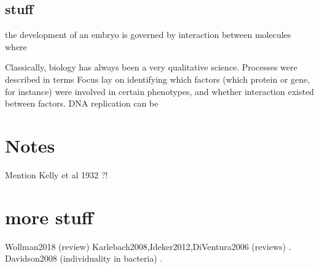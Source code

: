 \subsection*{stuff}

 the development of an embryo is governed by interaction between molecules where 


Classically, biology has always been a very qualitative science.
%
Processes were described in terms 
Focus lay on identifying which factors (which protein or gene, for instance) were involved in certain phenotypes, and whether interaction existed between factors.
%
DNA replication can be 




%
%
%




\section*{Notes}

Mention Kelly et al 1932 \cite{Kelly1932}?!

\section*{more stuff}


Wollman2018 (review)
Karlebach2008,Ideker2012,DiVentura2006 (reviews) \cite{Karlebach2008,Ideker2012,DiVentura2006}.
Davidson2008 (individuality in bacteria) \cite{Davidson2008}.



